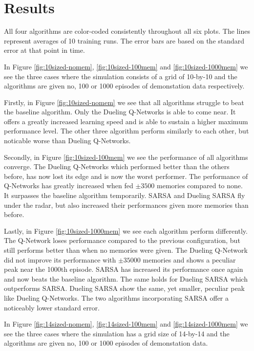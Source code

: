 \section{Results}
All four algorithms are color-coded consistently throughout all six plots. The lines represent averages of 10 training runs. The error bars are based on the standard error at that point in time.

In Figure \ref{fig:10sized-nomem}, \ref{fig:10sized-100mem} and \ref{fig:10sized-1000mem} we see the three cases where the simulation consists of a grid of 10-by-10 and the algorithms are given no, 100 or 1000 episodes of demonstation data respectively.

Firstly, in Figure \ref{fig:10sized-nomem} we see that all algorithms struggle to beat the baseline algorithm. Only the Dueling Q-Networks is able to come near. It offers a greatly increased learning speed and is able to sustain a higher maximum performance level. The other three algorithm perform similarly to each other, but noticable worse than Dueling Q-Networks.

Secondly, in Figure \ref{fig:10sized-100mem} we see the performance of all algorithms converge. The Dueling Q-Networks which performed better than the others before, has now lost its edge and is now the worst performer. The performance of Q-Networks has greatly increased when fed $\pm 3500$ memories compared to none. It surpasses the baseline algorithm temporarily. SARSA and Dueling SARSA fly under the radar, but also increased their performances given more memories than before.

Lastly, in Figure \ref{fig:10sized-1000mem} we see each algorithm perform differently. The Q-Network loses performance compared to the previous configuration, but still performs better than when no memories were given. The Dueling Q-Network did not improve its performance with $\pm 35000$ memories and shows a peculiar peak near the 1000th episode. SARSA has increased its performance once again and now beats the baseline algorithm. The same holds for Dueling SARSA which outperforms SARSA. Dueling SARSA show the same, yet smaller, peculiar peak like Dueling Q-Networks. The two algorithms incorporating SARSA offer a noticeably lower standard error.

In Figure \ref{fig:14sized-nomem}, \ref{fig:14sized-100mem} and \ref{fig:14sized-1000mem} we see the three cases where the simulation has a grid size of 14-by-14 and the algorithms are given no, 100 or 1000 episodes of demonstation data.

